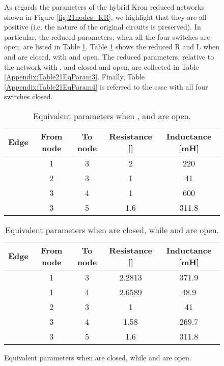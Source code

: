 \documentclass[a4paper]{article}
\theoremstyle{plain}
\begin{document}
\begin{figure}[htb]
\begin{circuitikz}[scale=.91,transform shape, color=black]
	As regards the parameters of the hybrid Kron reduced networks
        shown in Figure \ref{fig:21nodes_KR}, we highlight that they
        are all positive (i.e. the nature of the original circuits is
        preserved). In particular, the reduced parameters, when all the four switches are open, are listed in Table \ref{Appendix:Table21EqParam1}. Table \ref{Appendix:Table21EqParam2} shows the reduced R and L when  and  are closed, with  and  open. The reduced parameters, relative to the network with ,  and  closed and  open, are collected in Table \ref{Appendix:Table21EqParam3}. Finally, Table \ref{Appendix:Table21EqParam4} is referred to the case with all four switches closed.
		\begin{table}[!h]
			\centering
			\begin{tabular}{ccccc}
				\toprule
				Edge & From node & To node & Resistance [] & Inductance [mH] \\
				\midrule
				 & 1 & 3 & 2 & 220\\
				 & 2 & 3 & 1 & 41\\
				 & 3 & 4 & 1 &  600 \\
				 & 3 & 5 & 1.6 & 311.8 \\
				\bottomrule
			\end{tabular}
			\caption{Equivalent parameters when ,  and  are open.}
			\label{Appendix:Table21EqParam1}
		\end{table}
		
		\begin{table}[!h]
			\centering
			\begin{tabular}{ccccc}
				\toprule
				Edge & From node & To node & Resistance [] & Inductance [mH] \\
				\midrule
				 & 1 & 3 & 2.2813 & 371.9\\
				 & 1 & 4 & 2.6589 & 48.9\\
				 & 2 & 3 & 1 & 41\\
				 & 3 & 4 & 1.58 &  269.7 \\
				 & 3 & 5 & 1.6 & 311.8 \\
				\bottomrule
			\end{tabular}
			\caption{Equivalent parameters when   are closed, while  and  are open.}
			\label{Appendix:Table21EqParam2}
		\end{table}
		

\end{circuitikz}
\end{figure}
\end{document}
